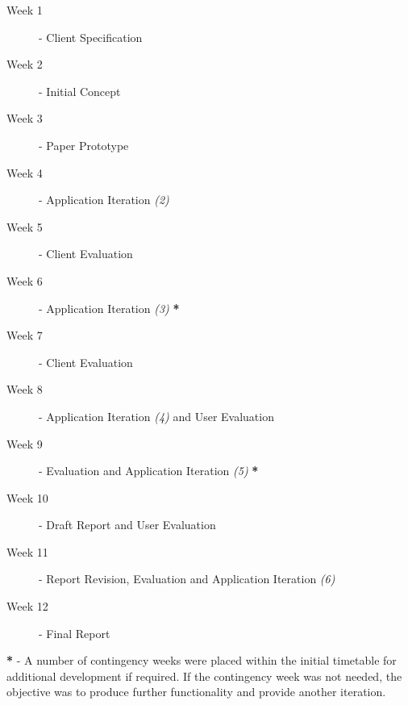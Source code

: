 \begin{description}
	\item[Week 1] - Client Specification
	\item[Week 2] - Initial Concept
	\item[Week 3] - Paper Prototype
	\item[Week 4] - Application Iteration \textit{(2)}
	\item[Week 5] - Client Evaluation
	\item[Week 6] - Application Iteration \textit{(3)} \textbf{*}
	\item[Week 7] - Client Evaluation
	\item[Week 8] - Application Iteration \textit{(4)} and User Evaluation
	\item[Week 9] - Evaluation and Application Iteration \textit{(5)} \textbf{*}
	\item[Week 10] - Draft Report and User Evaluation
	\item[Week 11] - Report Revision, Evaluation and Application Iteration \textit{(6)}
	\item[Week 12] - Final Report
\end{description}

\textbf{*} - A number of contingency weeks were placed within the initial timetable for additional development if required. If the contingency week was not needed, the objective was to produce further functionality and provide another iteration.
